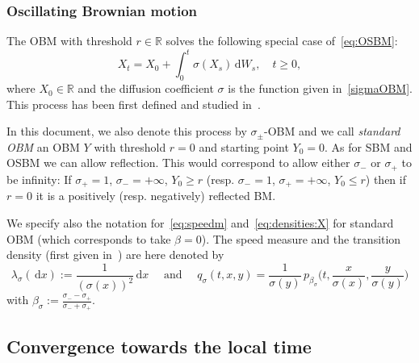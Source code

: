 \documentclass[12pt]{article}
\numberwithin{equation}{section}
\theoremstyle{definition}
\theoremstyle{remark}
\newcommand{\RR}{\mathbb{R}}
\newcommand{\ind}[1]{\mathbf{1}_{#1}}
\newcommand{\vd}{\,\mathrm{d}}
\begin{document}
\subsubsection{Oscillating Brownian motion}

The OBM with threshold $r\in \RR$ solves the following special case of~\eqref{eq:OSBM}: 
\begin{equation}
    \label{eq:OBM}
    X_t=X_0+\int_0^t \sigma(X_s)\vd W_s, \quad t\geq 0,
\end{equation}
where $X_0\in \RR$ and the diffusion coefficient $\sigma$ is the function given in~\eqref{sigmaOBM}.
This process has been first defined and studied in~\cite{kw}. 
%
%
%

In this document, we also denote this process by $\sigma_\pm$-OBM and we call {\em standard OBM\/} an OBM $Y$ with threshold $r=0$ and starting point $Y_0=0$.
%
As for SBM and OSBM we can allow reflection. This would correspond to allow either $\sigma_-$ or $\sigma_+$ to be infinity: If $\sigma_+=1$, $\sigma_-=+\infty$, $Y_0 \geq r$ (resp. $\sigma_-=1$, $\sigma_+=+\infty$, $Y_0 \leq r$) then if $r=0$ it is a positively (resp. negatively) reflected BM. 



We specify also the notation for~\eqref{eq:speedm} and~\eqref{eq:densities:X} for standard OBM (which corresponds to take $\beta=0$).
The speed measure and the transition density (first given in~\cite{kw}) are here denoted by
\begin{equation}	
\lambda_\sigma(\!\vd x) := \frac1{(\sigma(x))^2} \vd x 
\quad \text{ and } \quad
q_\sigma(t,x,y) =\frac{1}{\sigma(y)} \, p_{\beta_\sigma}\Big(t, \frac{x}{\sigma(x)}, \frac{y}{\sigma(y)}\Big)
\end{equation}
with ${\beta_\sigma}:= \frac{\sigma_- -\sigma_+}{\sigma_-+\sigma_+}$.


\subsection{Convergence towards the local time} \label{sec:main:SBM}
\end{document}
